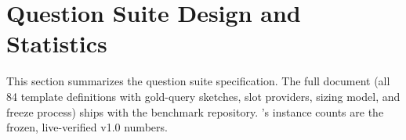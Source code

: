 \documentclass[sigconf,authordraft]{acmart}
\begin{document}


\section{Question Suite Design and Statistics}\label{app:questions}

This section summarizes the question suite specification. The full document (all 84 template definitions with gold-query sketches, slot providers, sizing model, and freeze process) ships with the benchmark repository. 's instance counts are the frozen, live-verified v1.0 numbers.
\end{document}

